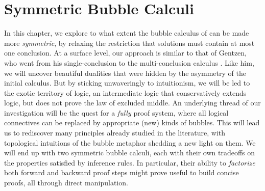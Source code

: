 \setchapterpreamble[u]{\margintoc}
\chapter{Symmetric Bubble Calculi}

In this chapter, we explore to what extent the bubble calculus of
 can be made more \emph{symmetric}, by relaxing the restriction
that solutions must contain at most one conclusion. At a surface level, our
approach is similar to that of Gentzen, who went from his single-conclusion
  to the multi-conclusion calculus . Like
him, we will uncover beautiful dualities that were hidden by the asymmetry of
the initial calculus. But by sticking unwaveringly to intuitionism, we will be
led to the exotic territory of  logic, an intermediate
logic that conservatively extends  logic, but does not prove the
law of excluded middle. An underlying thread of our investigation will be the
quest for a \emph{fully } proof system, where all logical connectives
can be replaced by appropriate (new) kinds of bubbles. This will lead us to
rediscover many principles already studied in the 
literature, with topological intuitions of the bubble metaphor shedding a new
light on them. We will end up with two symmetric bubble calculi, each with their
own tradeoffs on the properties satisfied by inference rules. In particular,
their ability to \emph{factorize} both forward and backward proof steps might
prove useful to build concise proofs, all through direct manipulation.


